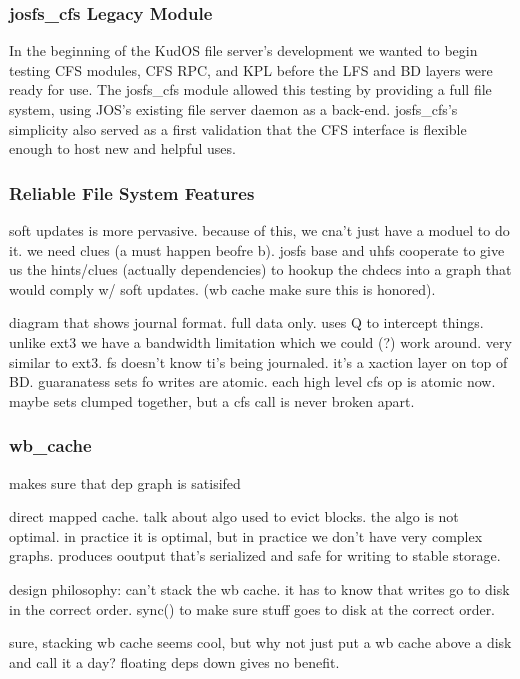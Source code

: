 \subsubsection{josfs\_cfs Legacy Module}

In the beginning of the KudOS file server's development we wanted to
begin testing CFS modules, CFS RPC, and KPL before the LFS and BD
layers were ready for use. The josfs\_cfs module allowed this testing
by providing a full file system, using JOS's existing file server
daemon as a back-end. josfs\_cfs's simplicity also served as a first
validation that the CFS interface is flexible enough to host new and
helpful uses.

\subsubsection{Reliable File System Features}

soft updates is more pervasive. because of this, we cna't just have a
moduel to do it. we need clues (a must happen beofre b). josfs base
and uhfs cooperate to give us the hints/clues (actually dependencies)
to hookup the chdecs into a graph that would comply w/ soft
updates. (wb cache make sure this is honored).

diagram that shows journal format. full data only. uses Q to intercept
things. unlike ext3 we have a bandwidth limitation which we could (?)
work around. very similar to ext3. fs doesn't know ti's being
journaled. it's a xaction layer on top of BD. guaranatess sets fo
writes are atomic. each high level cfs op is atomic now. maybe sets
clumped together, but a cfs call is never broken apart.

\subsubsection{wb\_cache}

makes sure that dep graph is satisifed

direct mapped cache. talk about algo used to evict blocks. the algo is
not optimal. in practice it is optimal, but in practice we don't have
very complex graphs. produces ooutput that's serialized and safe for
writing to stable storage.

design philosophy: can't stack the wb cache. it has to know that
writes go to disk in the correct order. sync() to make sure stuff goes
to disk at the correct order.

sure, stacking wb cache seems cool, but why not just put a wb cache
above a disk and call it a day? floating deps down gives no benefit.


